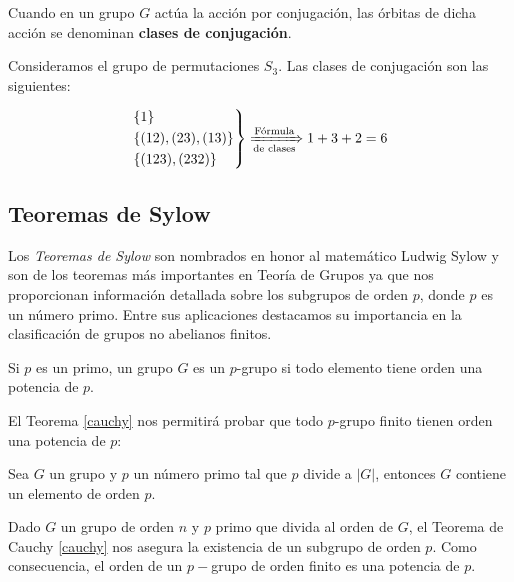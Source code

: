 \begin{remark} 
Cuando en un grupo $G$ actúa la acción por conjugación, las órbitas de dicha acción se denominan \textbf{clases de conjugación}.
\end{remark}

\begin{Ejemplo}
Consideramos el grupo de permutaciones $S_3$. Las clases de conjugación son las siguientes:

\begin{equation*}
\begin{rcases}
  \{ 1\}  \\
   \{ (12),(23),(13) \} \\
   \{ (123),(232)\} 
\end{rcases}
\xRightarrow[\text{de clases}]{\text{Fórmula}}
1+3+2 = 6
\end{equation*}
\end{Ejemplo}

\fi 




\newpage 
\subsection{Teoremas de Sylow} \label{sylows}

Los \textit{Teoremas de Sylow} son nombrados en honor al matemático Ludwig Sylow y son de los teoremas más importantes en Teoría de Grupos ya que nos proporcionan información detallada  sobre los subgrupos de orden $p$, donde $p$ es un número primo. Entre sus aplicaciones destacamos su importancia en la clasificación de grupos no abelianos finitos.






\begin{definition}
    Si $p$ es un primo, un grupo $G$ es un $p$-grupo si todo elemento tiene orden una potencia de $p$.
\end{definition}

El Teorema \ref{cauchy} nos permitirá probar que todo $p$-grupo finito tienen orden una potencia de $p$:

\begin{theorem}[Cauchy] \label{cauchy} Sea $G$ un grupo y $p$ un número primo tal que $p$ divide a $|G|$, entonces $G$ contiene un elemento de orden $p$.
\end{theorem}
\begin{remark}
Dado $G$ un grupo de orden $n$ y $p$ primo que divida al orden de $G$, el Teorema de Cauchy \eqref{cauchy} nos asegura la existencia de un subgrupo de orden $p$. Como consecuencia,  el orden de un $p-$grupo de orden finito es una potencia de $p$.
\end{remark}





